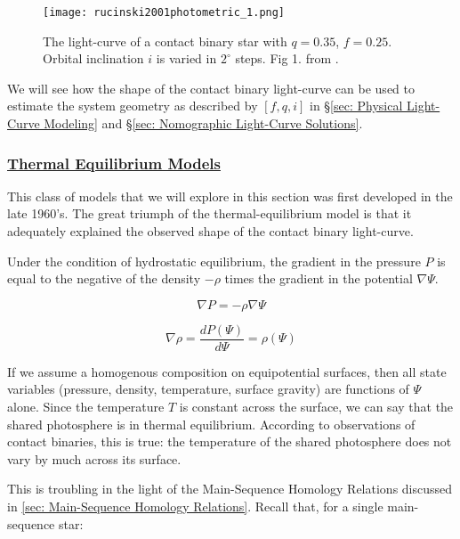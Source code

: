 \documentclass[12pt]{article} %
\numberwithin{equation}{section} %
\begin{document}
\begin{figure}[H] 
\centering
\texttt{[image: rucinski2001photometric\_1.png]}
\caption{The light-curve of a contact binary star with $q = 0.35$, $f = 0.25$. Orbital inclination $i$ is varied in $2^{\circ}$ steps. Fig 1. from \citet{rucinski2001photometric}.}
\label{fig: rucinski2001photometric_1}
\end{figure}

We will see how the shape of the contact binary light-curve can be used to estimate the system geometry as described by $[f,q,i]$ in \S\ref{sec: Physical Light-Curve Modeling} and \S\ref{sec: Nomographic Light-Curve Solutions}.

\subsubsection[Thermal Equilibrium Models]{\hyperlink{toc}{Thermal Equilibrium Models}} \label{sec: Thermal Equilibrium Models}

This class of models that we will explore in this section was first developed in the late 1960's. The great triumph of the thermal-equilibrium model is that it adequately explained the observed shape of the contact binary light-curve. 

Under the condition of hydrostatic equilibrium, the gradient in the pressure $P$ is equal to the negative of the density $- \rho$ times the gradient in the potential $\nabla \Psi$. 

\begin{equation} \label{eqn: equilibrium1}
\nabla P = - \rho \nabla \Psi
\end{equation}

\begin{equation} \label{eqn: equilibrium2}
\nabla \rho = \frac{dP(\Psi)}{d\Psi} = \rho(\Psi)
\end{equation}

If we assume a homogenous composition on equipotential surfaces, then all state variables (pressure, density, temperature, surface gravity) are functions of $\Psi$ alone. Since the temperature $T$ is constant across the surface, we can say that the shared photosphere is in thermal equilibrium. According to observations of contact binaries, this is true: the temperature of the shared photosphere does not vary by much across its surface. 

This is troubling in the light of the Main-Sequence Homology Relations discussed in \ref{sec: Main-Sequence Homology Relations}. Recall that, for a single main-sequence star:
\end{document}
